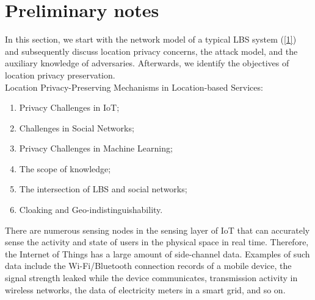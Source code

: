 \documentclass{opticajnl}
\begin{document}
\section{Preliminary notes}
In this section, we start with the network model of a typical LBS system (\ref{1}) and subsequently discuss location privacy concerns, the attack model, and the auxiliary knowledge of adversaries. Afterwards, we identify the objectives of location privacy preservation.
\\
Location Privacy-Preserving Mechanisms in Location-based Services:
\\
\begin{enumerate}
    \item Privacy Challenges in IoT;
    \item Challenges in Social Networks;
    \item Privacy Challenges in Machine Learning;
    \item The scope of knowledge;
    \item The intersection of LBS and social networks;
    \item Cloaking and Geo-indistinguishability.

\end{enumerate}
There are numerous sensing nodes in the sensing layer of IoT that can accurately sense the activity and state of users in the physical space in real time. Therefore, the Internet of Things has a large amount of side-channel data. Examples of such data include the Wi-Fi/Bluetooth connection records of a mobile device, the signal strength leaked while the device communicates, transmission activity in wireless networks, the data of electricity meters in a smart grid, and so on.
\end{document}

